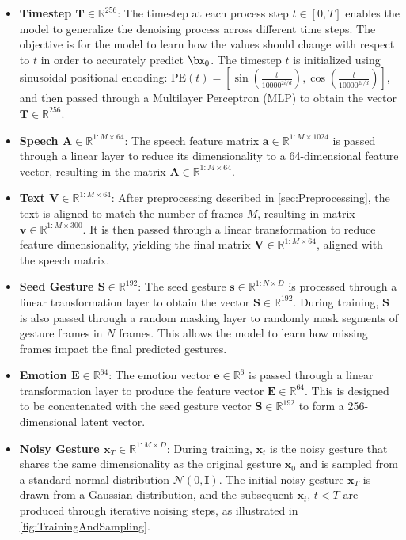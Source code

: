 \begin{itemize}
	\item \textbf{Timestep $\mathbf{T} \in \mathbb{R}^{256}$}: The timestep at each process step $t \in [0, T]$ enables the model to generalize the denoising process across different time steps. The objective is for the model to learn how the values should change with respect to $t$ in order to accurately predict $\bx_0$. The timestep $t$ is initialized using sinusoidal positional encoding: $\text{PE}(t) = \left[ \sin{\left(\frac{t}{10000^{2i / d}}\right)}, \cos{\left(\frac{t}{10000^{2i / d}}\right)} \right]$, and then passed through a Multilayer Perceptron (MLP) to obtain the vector $\mathbf{T} \in \mathbb{R}^{256}$.
	
	\item \textbf{Speech $\mathbf{A} \in \mathbb{R}^{1:M \times 64}$}: The speech feature matrix $\mathbf{a} \in \mathbb{R}^{1:M \times 1024}$ is passed through a linear layer to reduce its dimensionality to a 64-dimensional feature vector, resulting in the matrix $\mathbf{A} \in \mathbb{R}^{1:M \times 64}$.
	
	\item \textbf{Text $\mathbf{V} \in \mathbb{R}^{1:M \times 64}$}: After preprocessing described in \autoref{sec:Preprocessing}, the text is aligned to match the number of frames $M$, resulting in matrix $\mathbf{v} \in \mathbb{R}^{1:M \times 300}$. It is then passed through a linear transformation to reduce feature dimensionality, yielding the final matrix $\mathbf{V} \in \mathbb{R}^{1:M \times 64}$, aligned with the speech matrix.
	
	\item \textbf{Seed Gesture $\mathbf{S} \in \mathbb{R}^{192}$}: The seed gesture $\mathbf{s} \in \mathbb{R}^{1:N \times D}$ is processed through a linear transformation layer to obtain the vector $\mathbf{S} \in \mathbb{R}^{192}$. During training, $\mathbf{S}$ is also passed through a random masking layer to randomly mask segments of gesture frames in $N$ frames. This allows the model to learn how missing frames impact the final predicted gestures.
	
	\item \textbf{Emotion $\mathbf{E} \in \mathbb{R}^{64}$}: The emotion vector $\mathbf{e} \in \mathbb{R}^{6}$ is passed through a linear transformation layer to produce the feature vector $\mathbf{E} \in \mathbb{R}^{64}$. This is designed to be concatenated with the seed gesture vector $\mathbf{S} \in \mathbb{R}^{192}$ to form a 256-dimensional latent vector.
	
	\item \textbf{Noisy Gesture $\mathbf{x}_{T} \in \mathbb{R}^{1:M \times D}$}: During training, $\mathbf{x}_t$ is the noisy gesture that shares the same dimensionality as the original gesture $\mathbf{x}_0$ and is sampled from a standard normal distribution $\mathcal{N}(0, \mathbf{I})$. The initial noisy gesture $\mathbf{x}_T$ is drawn from a Gaussian distribution, and the subsequent $\mathbf{x}_t, \, t < T$ are produced through iterative noising steps, as illustrated in \autoref{fig:TrainingAndSampling}.
\end{itemize}


